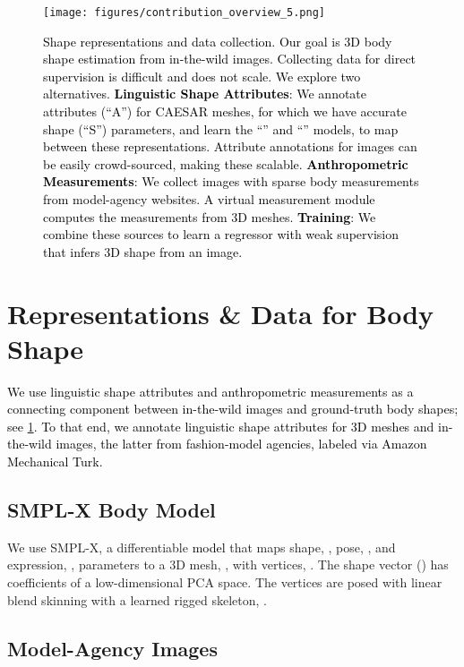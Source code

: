 \documentclass[10pt,twocolumn,letterpaper]{article}
\newcommand{\qheading}[1]{\noindent\textbf{#1}:}
\newcommand{\TODO}[1]{\xspace{\color{red} #1}\xspace}
\renewcommand{\TODO}[1]{\xspace{\color{black} #1}\xspace}
\newcommand{\AtoS}{\text{\mbox{A2S}}\xspace}
\newcommand{\StoA}{\text{\mbox{S2A}}\xspace}
\newcommand{\threeD}{3D\xspace}
\newcommand{\smplx}{\mbox{SMPL-X}\xspace}
\newcommand{\smplX}{\smplx}
\newcommand{\caesar}{\mbox{CAESAR}\xspace}
\newcommand{\inthewild}{\mbox{in-the-wild}\xspace}
\newcommand{\cameraready}[1]{\textcolor{Fuchsia}{{#1}}\xspace}
\renewcommand{\cameraready}[1]{\textcolor{black}{{#1}}\xspace}
\newcommand{\colorTERM}{blue}
\renewcommand{\colorTERM}{black}
\newcommand{\measurements}[0]{{\color{\colorTERM}anthropometric measurements}\xspace}
\newcommand{\Measurements}[0]{{\color{\colorTERM}Anthropometric Measurements}\xspace}
\newcommand{\linguisticshapeattributes}[0]{{\color{\colorTERM}linguistic shape attributes}\xspace}
\newcommand{\LinguisticShapeAttributes}[0]{{\color{\colorTERM}Linguistic Shape Attributes}\xspace}
\begin{document}
 \begin{figure}[!t]
    \centering
    \texttt{[image: figures/contribution\_overview\_5.png]}
    \caption{\cameraready{\TODO{Shape representations and data collection}. 
        Our goal is \threeD body shape estimation from \inthewild images. 
        Collecting data for direct supervision is difficult and does not scale.
        We explore two alternatives. \qheading{\LinguisticShapeAttributes} 
        We annotate attributes (``A'') for
        \caesar meshes, for which we have accurate shape (``S'') parameters, and learn the 
        ``\AtoS'' and ``\StoA'' models, to map between these representations.
        Attribute annotations for images can be easily crowd-sourced, making these scalable.
        \qheading{\Measurements} 
        We collect images with sparse body measurements
        from model-agency websites.
        A virtual measurement module \cite{pujades2019virtual}
        computes the measurements from \threeD meshes.
        \qheading{Training} We combine these sources to learn a regressor  with weak supervision
        that infers \threeD shape from an image.
        }
    }
    \label{fig:representation_overview}
\end{figure} 
\section{Representations \& Data for Body Shape}  \label{sec:shape_data_represent}

\cameraready{We use \linguisticshapeattributes and \measurements
as a connecting component 
between in-the-wild images and ground-truth body shapes;
see \cref{fig:representation_overview}. 
To that end, we annotate \linguisticshapeattributes for \threeD meshes and
in-the-wild
images, the latter from fashion-model agencies, labeled
via Amazon Mechanical Turk. }


\subsection{\smplX Body Model}   \label{sec:body_model} 
We use \smplx \cite{Pavlakos2019_smplifyx},
a differentiable \cameraready{model} that maps shape, , pose, ,
and expression, , parameters to a \threeD mesh, ,
with  vertices, . The shape vector  ()
has coefficients of a low-dimensional PCA space. 
The vertices are posed with linear blend skinning with a learned rigged skeleton, . 


\subsection{Model-Agency Images}      \label{sec:model_images}
\end{document}
